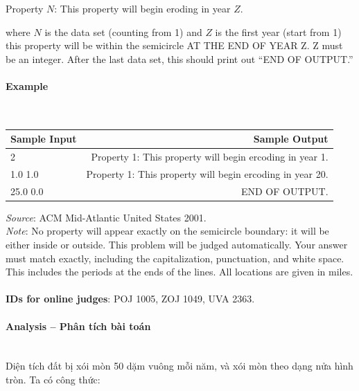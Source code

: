 \documentclass{article}
\begin{document}
\begin{center} Property $N$: This property will begin eroding in year $Z$.
\end{center}
where $N$ is the data set (counting from 1) and $Z$ is the first year (start from 1) this property will be within the semicircle AT THE END OF YEAR Z. Z must be an integer. After the last data set,
this should print out “END OF OUTPUT.”


\paragraph{Example}\mbox{} \\

\begin{table}[h]
    \centering
    \begin{tabular}{|l|r|}
        \hline
        \textbf{Sample Input} & \textbf{Sample Output} \\
        \hline
           2 & Property 1: This property will begin ercoding in year 1.  \\ 
           1.0 1.0 & Property 1: This property will begin ercoding in year 20. \\ 
           25.0 0.0 & END OF OUTPUT. \\  \hline
    \end{tabular}
\end{table}

\textit{Source}: ACM Mid-Atlantic United States 2001. \\

\textit{Note}: No property will appear exactly on the semicircle boundary: it will be
either inside or outside. This problem will be judged automatically. Your
answer must match exactly, including the capitalization, punctuation,
and white space. This includes the periods at the ends of the lines. All
locations are given in miles.
\\ 
\\
\textbf{IDs for online judges}:  POJ 1005, ZOJ 1049, UVA 2363.


\paragraph{Analysis -- Phân tích bài toán} \mbox{} \\

Diện tích đất bị xói mòn 50 dặm vuông mỗi năm, và xói mòn theo dạng nửa hình tròn. Ta có công thức:\\
\end{document}
